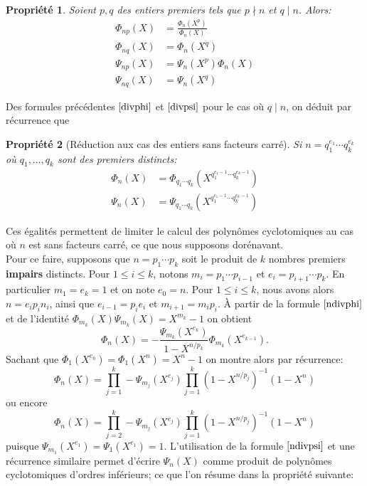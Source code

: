 \documentclass{article}
\theoremstyle{break}                  %
\newtheorem{propriete}{Propriété}
\begin{document}
\begin{propriete}
	Soient $p,q$ des entiers premiers tels que $p \nmid n$ et $q \mid n$. Alors:
	\begin{align}
		\Phi_{np}(X) &= \frac{\Phi_n(X^p)}{\Phi_n(X)} \tag{2.8a}\label{ndivphi}\\
		\Phi_{nq}(X) &= \Phi_n(X^q) \tag{2.8b}\label{divphi}\\
		\Psi_{np}(X) &= \Psi_n(X^p)\Phi_n(X) \tag{2.8c}\label{ndivpsi}\\
		\Psi_{nq}(X) &= \Psi_n(X^q)	 \tag{2.8d}\label{divpsi}
	\end{align}
\end{propriete}

Des formules précédentes $\ref{divphi}$ et $\ref{divpsi}$ pour le cas où $q \mid n$, on déduit par récurrence que


\begin{propriete}[Réduction aux cas des entiers sans facteurs carré]
	Si $n = q_1^{e_1} \cdots q_k^{e_k}$ où $q_1, \dots, q_k$ sont des premiers distincts:
	\begin{align*}
		\Phi_{n}(X) &= \Phi_{q_1 \cdots q_k}(X^{q_1^{e_1 - 1} \cdots q_k^{e_k - 1}})\\
		\Psi_{n}(X) &= \Psi_{q_1 \cdots q_k}(X^{q_1^{e_1 - 1} \cdots q_k^{e_k - 1}})
	\end{align*}
\end{propriete}

Ces égalités permettent de limiter le calcul des polynômes cyclotomiques au cas où $n$ est sans facteurs carré, ce que nous supposons dorénavant.\\


Pour ce faire, supposons que $n = p_1 \cdots p_k$ soit le produit de $k$ nombres premiers \textbf{impairs} distincts. Pour $1 \le i \le k$, notons $m_i = p_1 \cdots p_{i-1}$ et $e_i = p_{i+1} \cdots p_{k}$. En particulier $m_1=e_k=1$ et on note $e_0 = n$. Pour $1 \le i \le k$, nous avons alors $n = e_i p_i n_i$, ainsi que $e_{i-1}=p_i e_i$ et $m_{i+1}=m_i p_i$. À partir de la formule $\ref{ndivphi}$ et de l'identité $\Phi_{m_k}(X) \Psi_{m_k}(X) = X^{m_k}-1$ on obtient
$$\Phi_{n}(X) = - \frac{\Psi_{m_k}(X^{e_k})}{1- X^{n/p_k}} \Phi_{m_k}(X^{e_{k-1}}).$$
Sachant que $\Phi_1(X^{e_0}) = \Phi_1(X^n) = X^n-1$ on montre alors par récurrence:
$$\Phi_n(X)=\prod_{j=1}^{k} - \Psi_{m_j}(X^{e_j}) \prod_{j=1}^{k} (1-X^{n/p_j})^{-1}(1-X^n)$$
ou encore $$\Phi_n(X)=\prod_{j=2}^{k} - \Psi_{m_j}(X^{e_j}) \prod_{j=1}^{k} (1-X^{n/p_j})^{-1}(1-X^n)$$
puisque $\Psi_{m_1}(X^{e_1}) = \Psi_{1}(X^{e_1}) =1$. L'utilisation de la formule $\ref{ndivpsi}$ et une récurrence similaire permet d'écrire $\Psi_n(X)$ comme produit de polynômes cyclotomiques d'ordres inférieurs; ce que l'on résume dans la propriété suivante:
\end{document}
